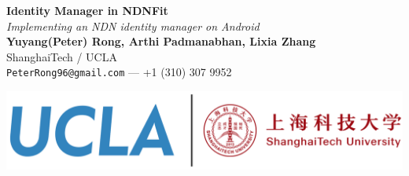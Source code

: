 \documentclass[a0,portrait]{poster}
\begin{document}


\begin{minipage}[b]{0.6\linewidth}
\veryHuge \color{NavyBlue} \textbf{Identity Manager in NDNFit} \color{Black}\\ %
\Huge\textit{Implementing an NDN identity manager on Android}\\[2cm] %
\Large \textbf{Yuyang(Peter) Rong, Arthi Padmanabhan, Lixia Zhang \footnotemark}\\[0.5cm] %
\Large ShanghaiTech / UCLA \\ [0.4cm] %
\Large \texttt{PeterRong96@gmail.com} --- +1 (310) 307 9952\\
\end{minipage}
%
\begin{minipage}[b]{0.4\linewidth}
	\includegraphics[width=\linewidth]{figures/logo.png}\\
\end{minipage}

\vspace{0.7cm} %

\end{document}
